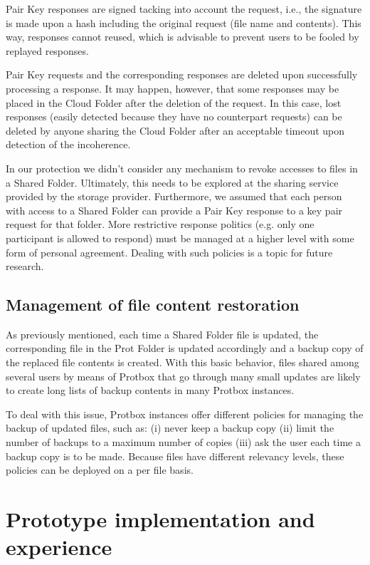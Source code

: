 \documentclass[english]{lni}
\newcommand\protbox{Protbox}
\newcommand\ProtF{Prot Folder}
\newcommand\SharedF{Shared Folder}
\newcommand\CloudF{Cloud Folder}
\newcommand\PairKey{Pair Key}
\begin{document}
{\PairKey} responses are signed tacking into account the request,
i.e., the signature is made upon a hash including the original
request (file name and contents). This way, responses cannot reused,
which is advisable to prevent users to be fooled by replayed responses.

{\PairKey} requests and the corresponding responses are deleted
upon successfully processing a
response. It may happen, however, that some responses may be placed
in the {\CloudF} after the deletion of the request. In this case,
lost responses (easily detected because they have no counterpart
requests) can be deleted by anyone sharing the {\CloudF} after an
acceptable timeout upon detection of the incoherence.

In our protection we didn't consider any mechanism to revoke
accesses to files in a {\SharedF}. Ultimately, this needs to be
explored at the sharing service provided by the storage
provider. Furthermore, we assumed that each person with access to
a {\SharedF} can provide a {\PairKey} response to a key pair
request for that folder. More restrictive response politics (e.g.
only one participant is allowed to respond) must be managed at a
higher level with some form of personal agreement.
Dealing with such policies is a topic for future research.

\subsection{Management of file content restoration}

As previously mentioned, each time a {\SharedF} file
is updated, the corresponding file in the {\ProtF}
is updated accordingly and a
backup copy of the replaced file contents is created. With this
basic behavior, files shared among several users by means of
{\protbox} that go through many small updates are likely to create
long lists of backup contents in many {\protbox} instances.

To deal with this issue, {\protbox} instances offer different
policies for managing the backup of updated files, such as: (i)
never keep a backup copy (ii) limit the number of backups to a
maximum number of copies (iii) ask the user each time a backup copy
is to be made. Because files have different 
relevancy levels,
these policies can be deployed on a per file basis. 




\section{Prototype implementation and experience}
\label{experiences}
\end{document}
